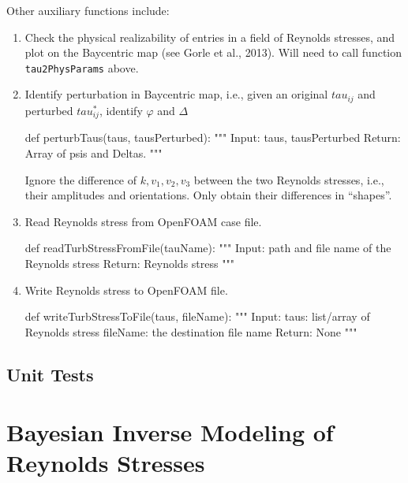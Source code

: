 \documentclass[paper = letter, fontsize = 11pt]{scrartcl} %
\begin{document}
Other auxiliary functions include:


\begin{enumerate}
\item Check the physical realizability of entries in a field of Reynolds stresses, and plot on the
  Baycentric map (see Gorle et al., 2013). Will need to call function \verb+tau2PhysParams+ above.
\item Identify perturbation in Baycentric map, i.e., given an original $tau_{ij}$ and perturbed
  $tau^*_{ij}$, identify $\varphi$ and $\Delta$
\begin{python}
def perturbTaus(taus, tausPerturbed):
    """
    Input:
    taus, tausPerturbed
    Return:
    Array of psis and Deltas. 
    """
\end{python}
Ignore the difference of $k, v_1, v_2, v_3$ between the two Reynolds stresses, i.e., their amplitudes
and orientations. Only obtain their differences in ``shapes''.


\item Read Reynolds stress from OpenFOAM case file.
\begin{python}
def readTurbStressFromFile(tauName):
    """
    Input:
    path and file name of the Reynolds stress
    Return:
    Reynolds stress
    """
\end{python}

\item Write Reynolds stress to OpenFOAM file.
\begin{python}
def writeTurbStressToFile(taus, fileName):
    """
    Input:
    taus: list/array of Reynolds stress
    fileName: the destination file name
    Return:
    None
    """
\end{python}

\end{enumerate}

\subsection{Unit Tests}



\section{Bayesian Inverse Modeling of Reynolds Stresses}
\end{document}
